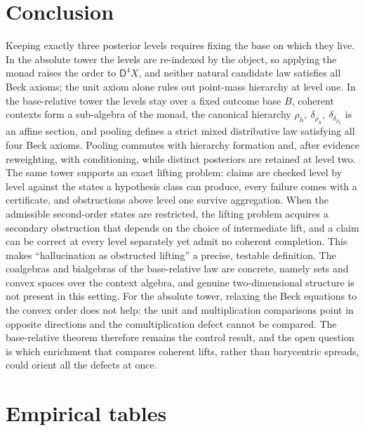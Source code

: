 \documentclass[11pt]{article}
\theoremstyle{definition}
\theoremstyle{remark}
\newcommand{\D}{\mathsf{D}}
\begin{document}
\section{Conclusion}

Keeping exactly three posterior levels requires fixing the base on which they live. In the
absolute tower the levels are re-indexed by the object, so applying the monad raises the order to
$\D^4X$, and neither natural candidate law satisfies all Beck axioms; the unit axiom alone rules out
point-mass hierarchy at level one. In the base-relative tower the levels stay over a fixed outcome
base $B$, coherent contexts form a sub-algebra of the monad, the canonical hierarchy
$\rho_h,\ \delta_{\rho_h},\ \delta_{\delta_{\rho_h}}$ is an affine section, and pooling defines a strict
mixed distributive law satisfying all four Beck axioms. Pooling commutes with hierarchy formation and, after evidence reweighting, with conditioning,
while distinct posteriors are retained at level two. The same tower supports an exact lifting
problem: claims are checked level by level against the states a hypothesis class can produce, every
failure comes with a certificate, and obstructions above level one survive aggregation. When the
admissible second-order states are restricted, the lifting problem acquires a secondary obstruction
that depends on the choice of intermediate lift, and a claim can be correct at every level separately
yet admit no coherent completion. This makes
``hallucination as obstructed lifting'' a precise, testable definition. The coalgebras and
bialgebras of the base-relative law are concrete, namely sets and convex spaces over the context
algebra, and genuine two-dimensional structure is not present in this setting. For the absolute
tower, relaxing the Beck equations to the convex order does not help: the unit and multiplication
comparisons point in opposite directions and the comultiplication defect cannot be compared. The
base-relative theorem therefore remains the control result, and the open question is which enrichment
that compares coherent lifts, rather than barycentric spreads, could orient all the defects at once.

\appendix

\section{Empirical tables}\label{app:empirical}
\end{document}
